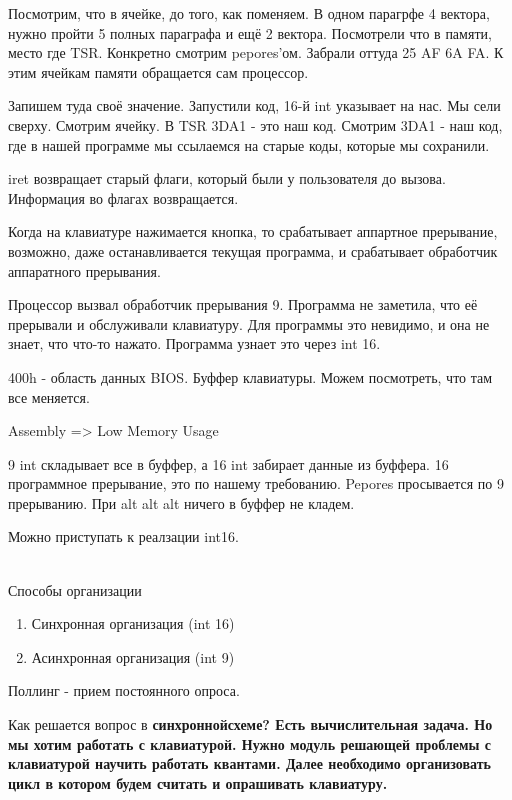 Посмотрим, что в ячейке, до того, как поменяем. В одном парагрфе 4 вектора, нужно пройти 5 полных параграфа и ещё 2 вектора. Посмотрели что в памяти, место где TSR. Конкретно смотрим pepores'ом. Забрали оттуда 25 AF 6A FA. К этим ячейкам памяти обращается сам процессор. 

Запишем туда своё значение. Запустили код, 16-й int указывает на нас. Мы сели сверху. Смотрим ячейку. В TSR 3DA1 - это наш код. Смотрим 3DA1 - наш код, где в нашей программе мы ссылаемся на старые коды, которые мы сохранили.

iret возвращает старый флаги, который были у пользователя до вызова. Информация во флагах возвращается. 

\begin{rem}
Когда на клавиатуре нажимается кнопка, то срабатывает аппартное прерывание, возможно, даже останавливается текущая программа, и срабатывает обработчик аппаратного прерывания. 
\end{rem}

Процессор вызвал обработчик прерывания 9. Программа не заметила, что её прерывали и обслуживали клавиатуру. Для программы это невидимо, и она не знает, что что-то нажато. Программа узнает это через int 16.

400h - область данных BIOS. Буффер клавиатуры. Можем посмотреть, что там все меняется.  

Assembly => Low Memory Usage

9 int складывает все в буффер, а 16 int забирает данные из буффера. 
16 программное прерывание, это по нашему требованию. Pepores просывается по 9 прерыванию.
При alt alt alt ничего в буффер не кладем.

\begin{off}Можно приступать к реалзации int16.\end{off}
~\\
Способы организации
\begin{enumerate}
\item Синхронная организация (int 16)
\item Асинхронная организация (int 9)
\end{enumerate}
Поллинг - прием постоянного опроса.

Как решается вопрос в \bfseries синхронной\mdseries схеме?
Есть вычислительная задача. Но мы хотим работать с клавиатурой. Нужно модуль решающей проблемы с клавиатурой научить работать квантами. Далее необходимо организовать цикл в котором будем считать и опрашивать клавиатуру. 

